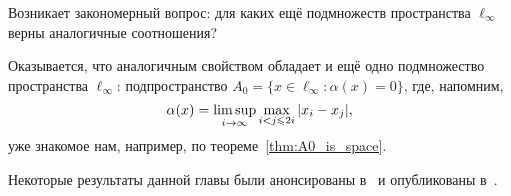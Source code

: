 Возникает закономерный вопрос: для каких ещё подмножеств пространства $\ell_\infty$
верны аналогичные соотношения?

Оказывается, что аналогичным свойством обладает и ещё одно подмножество пространства $\ell_\infty$: подпространство
$A_0 = \{ x \in \ell_\infty : \alpha(x) =0 \}$,
где, напомним,
\begin{equation*}
	\alpha(x) = \varlimsup_{i\to\infty} \max_{i<j\leqslant 2i} |x_i - x_j|
	,
\end{equation*}
уже знакомое нам, например, по теореме~\ref{thm:A0_is_space}.

Некоторые результаты данной главы были анонсированы в~\cite{our-mz2021linearhulls}
и опубликованы в~\cite{avdeev2021vestnik}.
